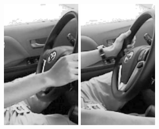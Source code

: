\documentclass{beamer}
\begin{document}
\begin{frame}
\begin{columns}
\begin{column}{0.5\textwidth}
\begin{center}
     				\includegraphics[width=0.3\textwidth]{steering_wheel3}\hspace{0.1cm}
     				\includegraphics[width=0.3\textwidth]{steering_wheel4}
     				
     			\end{center}
     		\end{column}
     	\end{columns}
     	
     \end{frame}

	
	
\end{document}
